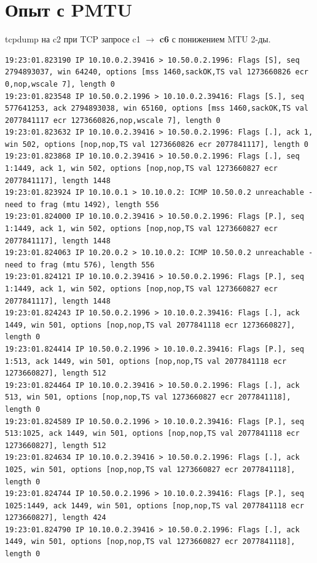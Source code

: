 \documentclass[a4paper,12pt]{article}
\begin{document}
\section{Опыт с PMTU}

tcpdump на c2 при TCP запросе c1 $\to$ \textbf{c6} с понижением MTU 2-ды.

\begin{Verbatim}
19:23:01.823190 IP 10.10.0.2.39416 > 10.50.0.2.1996: Flags [S], seq 2794893037, win 64240, options [mss 1460,sackOK,TS val 1273660826 ecr 0,nop,wscale 7], length 0
19:23:01.823548 IP 10.50.0.2.1996 > 10.10.0.2.39416: Flags [S.], seq 577641253, ack 2794893038, win 65160, options [mss 1460,sackOK,TS val 2077841117 ecr 1273660826,nop,wscale 7], length 0
19:23:01.823632 IP 10.10.0.2.39416 > 10.50.0.2.1996: Flags [.], ack 1, win 502, options [nop,nop,TS val 1273660826 ecr 2077841117], length 0
19:23:01.823868 IP 10.10.0.2.39416 > 10.50.0.2.1996: Flags [.], seq 1:1449, ack 1, win 502, options [nop,nop,TS val 1273660827 ecr 2077841117], length 1448
19:23:01.823924 IP 10.10.0.1 > 10.10.0.2: ICMP 10.50.0.2 unreachable - need to frag (mtu 1492), length 556
19:23:01.824000 IP 10.10.0.2.39416 > 10.50.0.2.1996: Flags [P.], seq 1:1449, ack 1, win 502, options [nop,nop,TS val 1273660827 ecr 2077841117], length 1448
19:23:01.824063 IP 10.20.0.2 > 10.10.0.2: ICMP 10.50.0.2 unreachable - need to frag (mtu 576), length 556
19:23:01.824121 IP 10.10.0.2.39416 > 10.50.0.2.1996: Flags [P.], seq 1:1449, ack 1, win 502, options [nop,nop,TS val 1273660827 ecr 2077841117], length 1448
19:23:01.824243 IP 10.50.0.2.1996 > 10.10.0.2.39416: Flags [.], ack 1449, win 501, options [nop,nop,TS val 2077841118 ecr 1273660827], length 0
19:23:01.824414 IP 10.50.0.2.1996 > 10.10.0.2.39416: Flags [P.], seq 1:513, ack 1449, win 501, options [nop,nop,TS val 2077841118 ecr 1273660827], length 512
19:23:01.824464 IP 10.10.0.2.39416 > 10.50.0.2.1996: Flags [.], ack 513, win 501, options [nop,nop,TS val 1273660827 ecr 2077841118], length 0
19:23:01.824589 IP 10.50.0.2.1996 > 10.10.0.2.39416: Flags [P.], seq 513:1025, ack 1449, win 501, options [nop,nop,TS val 2077841118 ecr 1273660827], length 512
19:23:01.824634 IP 10.10.0.2.39416 > 10.50.0.2.1996: Flags [.], ack 1025, win 501, options [nop,nop,TS val 1273660827 ecr 2077841118], length 0
19:23:01.824744 IP 10.50.0.2.1996 > 10.10.0.2.39416: Flags [P.], seq 1025:1449, ack 1449, win 501, options [nop,nop,TS val 2077841118 ecr 1273660827], length 424
19:23:01.824790 IP 10.10.0.2.39416 > 10.50.0.2.1996: Flags [.], ack 1449, win 501, options [nop,nop,TS val 1273660827 ecr 2077841118], length 0

\end{Verbatim}
\end{document}
